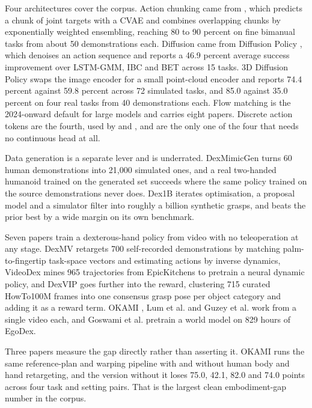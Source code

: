 \label{sec:train:human:arch}
Four architectures cover the
corpus. Action chunking came from \cite{aloha_act_2023}, which predicts a chunk of joint
targets with a CVAE and combines overlapping chunks by exponentially weighted ensembling,
reaching 80 to 90 percent on fine bimanual tasks from about 50 demonstrations each. Diffusion
came from Diffusion Policy \cite{diffusion_policy_2023}, which denoises an action sequence and
reports a 46.9 percent average success improvement over LSTM-GMM, IBC and BET across 15 tasks.
3D Diffusion Policy \cite{dp3_2024} swaps the image encoder for a small point-cloud encoder and
reports 74.4 percent against 59.8 percent across 72 simulated tasks, and 85.0 against 35.0
percent on four real tasks from 40 demonstrations each. Flow matching is the 2024-onward
default for large models and carries eight papers. Discrete action tokens are the fourth, used
by \cite{openvla_2024} and \cite{metis_2025}, and are the only one of the four that needs no
continuous head at all.

Data generation is a separate lever and is underrated. DexMimicGen \cite{dexmimicgen_2024} turns
60 human demonstrations into 21,000 simulated ones, and a real two-handed humanoid trained on the
generated set succeeds where the same policy trained on the source demonstrations never does. Dex1B
\cite{dex1b_2025} iterates optimisation, a proposal model and a simulator filter into roughly a
billion synthetic grasps, and beats the prior best by a wide margin on its own benchmark.

\label{sec:train:human:video}
Seven papers train a dexterous-hand policy from video with no teleoperation at any stage. DexMV
\cite{dexmv_2021} retargets 700 self-recorded demonstrations by matching palm-to-fingertip
task-space vectors and estimating actions by inverse dynamics, VideoDex \cite{videodex_2022} mines
965 trajectories from EpicKitchens to pretrain a neural dynamic policy, and DexVIP
\cite{dexvip_2022} goes further into the reward, clustering 715 curated HowTo100M frames into one
consensus grasp pose per object category and adding it as a reward term. OKAMI \cite{okami_2024},
Lum et al. \cite{human2sim2robot_2025} and Guzey et al. \cite{hudor_2024} work from a single video
each, and Goswami et al. \cite{wm_dex_human_videos_2025} pretrain a world model on 829 hours of
EgoDex.

\label{sec:train:human:gap}
Three papers measure the gap directly rather than asserting it. OKAMI \cite{okami_2024} runs the
same reference-plan and warping pipeline with and without human body and hand retargeting, and the
version without it loses 75.0, 42.1, 82.0 and 74.0 points across four task and setting pairs. That
is the largest clean embodiment-gap number in the corpus.

